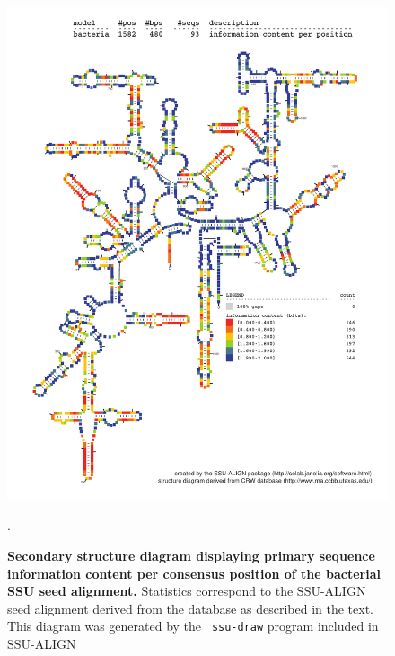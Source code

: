 \begin{figure}
\begin{center}
\includegraphics[width=5.7in]{Figures/bacteria-0p1-info}
\end{center}
\caption[Secondary structure diagram displaying primary sequence
  information content per consensus position of the bacterial SSU seed
  alignment]{\textbf{Secondary structure diagram displaying primary
  sequence information content per consensus position of the bacterial SSU seed
  alignment.} Statistics correspond to the SSU-ALIGN seed
  alignment derived from the  database \cite{CannoneGutell02}
  as described in the text. This diagram was generated by the {\tt
  ssu-draw} program included in SSU-ALIGN}.
\label{fig:bacinfo}
\end{figure}

\newpage 

